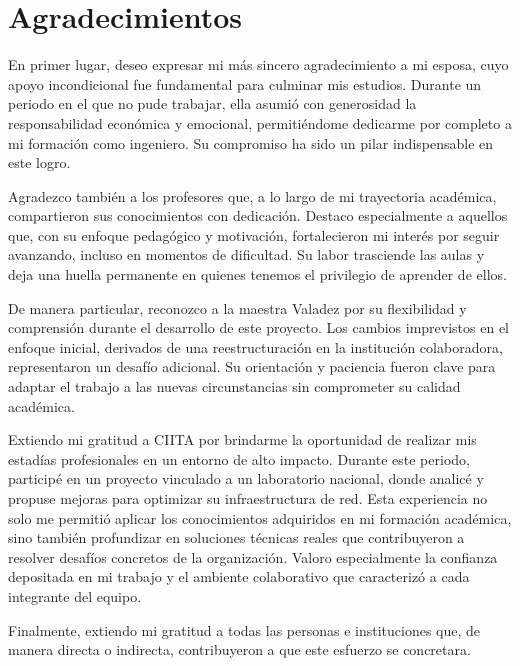 \section*{Agradecimientos}
En primer lugar, deseo expresar mi más sincero agradecimiento a mi esposa, cuyo apoyo incondicional fue fundamental para culminar mis estudios. Durante un periodo en el que no pude trabajar, ella asumió con generosidad la responsabilidad económica y emocional, permitiéndome dedicarme por completo a mi formación como ingeniero. Su compromiso ha sido un pilar indispensable en este logro.

Agradezco también a los profesores que, a lo largo de mi trayectoria académica, compartieron sus conocimientos con dedicación. Destaco especialmente a aquellos que, con su enfoque pedagógico y motivación, fortalecieron mi interés por seguir avanzando, incluso en momentos de dificultad. Su labor trasciende las aulas y deja una huella permanente en quienes tenemos el privilegio de aprender de ellos.

De manera particular, reconozco a la maestra Valadez por su flexibilidad y comprensión durante el desarrollo de este proyecto. Los cambios imprevistos en el enfoque inicial, derivados de una reestructuración en la institución colaboradora, representaron un desafío adicional. Su orientación y paciencia fueron clave para adaptar el trabajo a las nuevas circunstancias sin comprometer su calidad académica.

Extiendo mi gratitud a CIITA por brindarme la oportunidad de realizar mis estadías profesionales en un entorno de alto impacto. Durante este periodo, participé en un proyecto vinculado a un laboratorio nacional, donde analicé y propuse mejoras para optimizar su infraestructura de red. Esta experiencia no solo me permitió aplicar los conocimientos adquiridos en mi formación académica, sino también profundizar en soluciones técnicas reales que contribuyeron a resolver desafíos concretos de la organización. Valoro especialmente la confianza depositada en mi trabajo y el ambiente colaborativo que caracterizó a cada integrante del equipo.

Finalmente, extiendo mi gratitud a todas las personas e instituciones que, de manera directa o indirecta, contribuyeron a que este esfuerzo se concretara.



\newpage